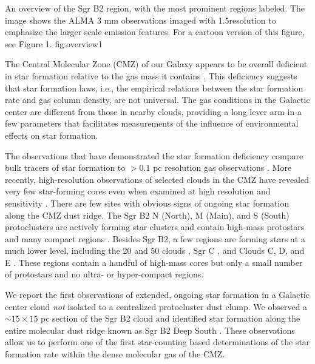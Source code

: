 \documentclass[twocolumn]{aastex61}
\begin{document}
{An overview of the Sgr B2 region, with the most prominent regions labeled.
The image shows the ALMA 3 mm observations imaged with 1.5\arcsec resolution
to emphasize the larger scale emission features.  For a cartoon version of this
figure, see \citet{Schmiedeke2016a} Figure 1.}
{fig:overview}{1}{\textwidth}

The Central Molecular Zone (CMZ) of our Galaxy appears to be overall deficient
in star formation relative to the gas mass it contains
\citep{Beuther2012a,Immer2012a,Longmore2013a,
Kauffmann2016a,Kauffmann2016b,Barnes2016c,Barnes2017b}.  This deficiency
suggests that star formation laws, i.e., the empirical relations between
the star formation rate and gas column density, are not universal.  The gas
conditions in the Galactic center are different from those in nearby clouds,
providing a long lever arm in a few
parameters \citep[e.g., pressure, temperature, velocity
dispersion;
][]{Kruijssen2013a,Ginsburg2016a,Immer2016a,Shetty2012a,Henshaw2016a} that
facilitates measurements of the influence of environmental effects on star
formation.


The observations that have demonstrated the star formation deficiency compare
bulk tracers of star formation to $>0.1$ pc resolution gas observations
\citep[e.g.][]{Barnes2017b}.  More recently, high-resolution observations
of selected clouds in the CMZ have revealed very few star-forming cores
even when examined at high resolution and sensitivity
\citep{Johnston2014a,Rathborne2014a,Rathborne2015a,Kauffmann2016a,Kauffmann2016b}.
There are 
few sites with obvious signs of ongoing star formation along the CMZ dust ridge.
The Sgr B2
N (North), M (Main), and S (South) protoclusters \citep[][Figure
\ref{fig:overview}]{Schmiedeke2016a} are actively  forming star clusters
and contain high-mass protostars and many compact \hii regions
\citep[e.g.][]{Higuchi2015a,Gaume1995a}. 
Besides Sgr B2, a few regions are forming stars at a much lower level,
including the 20 \kms and 50 \kms clouds \citep{Lu2015b,Lu2016a,2017a},
Sgr C \citep{Kendrew2013a},
and
Clouds C, D, and E \citep[][Walker et al, in
prep;]{Ginsburg2015b,Barnes2017b}.  These regions contain a handful of
high-mass cores but only a small number of protostars and no ultra-
or hyper-compact \hii regions.

We report the first observations of extended, ongoing star formation in a
Galactic center cloud \emph{not} isolated to a centralized protocluster dust
clump.  We observed a $\sim15\times15$ pc section of the Sgr B2 cloud and
identified star formation along the entire molecular dust ridge known as Sgr B2
Deep South \citep[DS, also known as the `Southern
Complex'][]{Jones2012a,Schmiedeke2016a}.  These observations allow us to
perform one of the first star-counting based determinations of the star
formation rate within the dense molecular gas of the CMZ.
\end{document}
